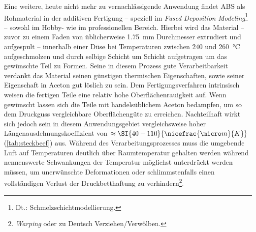             Eine weitere, heute nicht mehr zu vernachlässigende Anwendung findet ABS als Rohmaterial in der additiven Fertigung
             – speziell im \textit{Fused Deposition Modeling}\footnote{Dt.: Schmelzschichtmodellierung.} – sowohl im Hobby-
            wie im professionellen Bereich. Hierbei wird das Material – zuvor zu einem Faden von üblicherweise \SI{1,75}{mm}
            Durchmesser extrudiert und aufgespult – innerhalb einer Düse bei Temperaturen zwischen \SI{240}{} und \SI{260}{\celsius} aufgeschmolzen
            und durch selbige Schicht um Schicht aufgetragen um das gewünschte Teil zu Formen. Seine in diesem Prozess gute
            Verarbeitbarkeit verdankt das Material seinen günstigen thermischen Eigenschaften, sowie seiner Eigenschaft in
            Aceton gut löslich zu sein. Dem Fertigungsverfahren intrinsisch weisen die fertigen Teile eine relativ hohe
            Oberflächenrauigkeit auf. Wenn gewünscht lassen sich die Teile mit handelsüblichem Aceton bedampfen, um so
            dem Druckguss vergleichbare Oberflächengüte zu erreichen. Nachteilhaft wirkt sich jedoch sein in diesem Anwendungsgebiet
            vergleichsweise hoher Längenausdehnungskoeffizient von \(\approx \SI{40-110}{\nicefrac{\micro m}{K}}\) (\cref{tab:steckbeef}) aus. Während des Verarbeitungsprozesses muss die umgebende Luft
            auf Temperaturen deutlich über Raumtemperatur gehalten werden während nennenswerte Schwankungen der Temperatur
            möglichst unterdrückt werden müssen, um unerwünschte Deformationen oder schlimmstenfalls einen vollständigen
            Verlust der Druckbetthaftung zu verhindern\footnote{\textit{Warping} oder zu Deutsch Verziehen/Verwölben.}.

